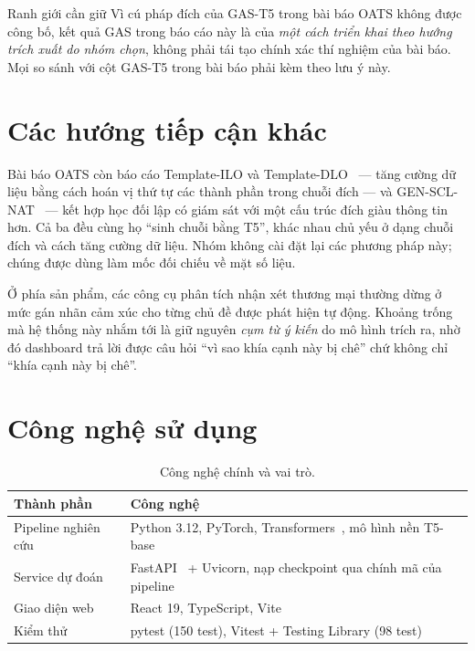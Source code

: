 \documentclass[12pt,a4paper]{report}
\newcommand{\enquote}[1]{“#1”}
\begin{document}
\begin{ghichu}{Ranh giới cần giữ}
Vì cú pháp đích của GAS-T5 trong bài báo OATS không được công bố, kết quả GAS trong báo cáo này là của \emph{một cách
triển khai theo hướng trích xuất do nhóm chọn}, không phải tái tạo chính xác thí nghiệm của bài báo. Mọi so sánh với
cột GAS-T5 trong bài báo phải kèm theo lưu ý này.
\end{ghichu}

\section{Các hướng tiếp cận khác}

Bài báo OATS còn báo cáo Template-ILO và Template-DLO~\cite{templatedlo2021} --- tăng cường dữ liệu bằng cách hoán vị
thứ tự các thành phần trong chuỗi đích --- và GEN-SCL-NAT~\cite{genscl2023} --- kết hợp học đối lập có giám sát với một
cấu trúc đích giàu thông tin hơn. Cả ba đều cùng họ \enquote{sinh chuỗi bằng T5}, khác nhau chủ yếu ở dạng chuỗi đích và
cách tăng cường dữ liệu. Nhóm không cài đặt lại các phương pháp này; chúng được dùng làm mốc đối chiếu về mặt số liệu.

Ở phía sản phẩm, các công cụ phân tích nhận xét thương mại thường dừng ở mức gán nhãn cảm xúc cho từng chủ đề được phát
hiện tự động. Khoảng trống mà hệ thống này nhắm tới là giữ nguyên \emph{cụm từ ý kiến} do mô hình trích ra, nhờ đó
dashboard trả lời được câu hỏi \enquote{vì sao khía cạnh này bị chê} chứ không chỉ \enquote{khía cạnh này bị chê}.

\section{Công nghệ sử dụng}

\begin{table}[H]
\centering
\caption{Công nghệ chính và vai trò.}
\begin{tabularx}{\linewidth}{@{}lX@{}}
\toprule
\textbf{Thành phần} & \textbf{Công nghệ} \\
\midrule
Pipeline nghiên cứu & Python 3.12, PyTorch, Transformers~\cite{huggingface}, mô hình nền T5-base~\cite{t5} \\
Service dự đoán & FastAPI~\cite{fastapi} + Uvicorn, nạp checkpoint qua chính mã của pipeline \\
Giao diện web & React 19, TypeScript, Vite \\
Kiểm thử & pytest (150 test), Vitest + Testing Library (98 test) \\
\bottomrule
\end{tabularx}
\end{table}
\end{document}
